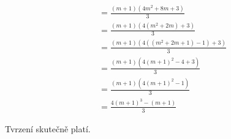 \begin{align}
	&= \frac{(m + 1)(4m^2 + 8m + 3)}{3} \\
	&= \frac{(m + 1)(4(m^2 + 2m) + 3)}{3} \\
	&= \frac{(m + 1)(4((m^2 + 2m + 1) - 1) + 3)}{3} \\
	&= \frac{(m + 1)(4(m + 1)^2 - 4 + 3)}{3} \\
	&= \frac{(m + 1)(4(m + 1)^2 - 1)}{3} \\
	&= \frac{4(m + 1)^3 - (m + 1)}{3} 
\end{align}

Tvrzení skutečně platí.
